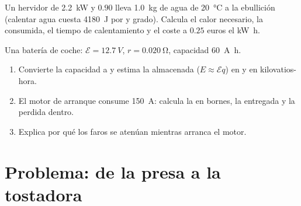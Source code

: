 \begin{exercise}[$\star\star\star$]\label{exo:g11:circuits-and-power:14}
Un hervidor de \qty{2.2}{kW} y  $0.90$ lleva \qty{1.0}{kg} de
agua de \qty{20}{\degreeCelsius} a la ebullición (calentar agua cuesta
\qty{4180}{J} por  y grado). Calcula el calor necesario, la
 consumida, el tiempo de calentamiento y el coste a
$0.25$ euros el \unit{kW.h}.
\end{exercise}

\begin{exercise}[$\star\star\star$]\label{exo:g11:circuits-and-power:15}
Una batería de coche: $\mathcal{E} = \qty{12.7}{V}$,
$r = \qty{0.020}{\ohm}$, capacidad \qty{60}{A.h}.
\begin{enumerate}
  \item Convierte la capacidad a  y estima la 
        almacenada ($E \approx \mathcal{E} q$) en  y en
        kilovatios-hora.
  \item El motor de arranque consume \qty{150}{A}: calcula la  en
        bornes, la  entregada y la  perdida dentro.
  \item Explica por qué los faros se atenúan mientras arranca el motor.
\end{enumerate}
\end{exercise}

\section{Problema: de la presa a la tostadora}

